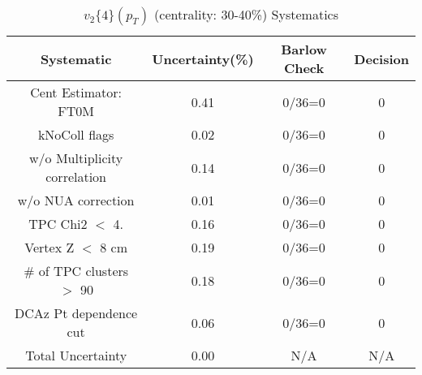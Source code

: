 \begin{table}[htbp]
\caption{$v_2\{4\}(p_{T})$ (centrality: 30-40\%) Systematics}
\label{tab:Sys_pTDiffv24ChFull}
\centering
\begin{tabular}{|c|c|c|c|}
\hline
Systematic & Uncertainty(\%) & Barlow Check & Decision \\
\hline
Cent Estimator: FT0M & 0.41 & 0/36=0 & 0 \\
kNoColl flags & 0.02 & 0/36=0 & 0 \\
w/o Multiplicity correlation & 0.14 & 0/36=0 & 0 \\
w/o NUA correction & 0.01 & 0/36=0 & 0 \\
TPC Chi2 $<$ 4. & 0.16 & 0/36=0 & 0 \\
Vertex Z $<$ 8 cm & 0.19 & 0/36=0 & 0 \\
\# of TPC clusters $>$ 90 & 0.18 & 0/36=0 & 0 \\
DCAz Pt dependence cut & 0.06 & 0/36=0 & 0 \\
\hline
Total Uncertainty & 0.00 & N/A & N/A \\
\hline
\end{tabular}
\end{table}
